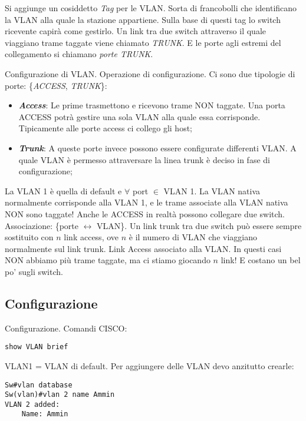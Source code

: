 Si aggiunge un cosiddetto \textit{Tag} per le VLAN. Sorta di francobolli che identificano la VLAN alla quale la stazione appartiene. Sulla base di questi tag lo switch ricevente capirà come gestirlo. Un link tra due switch attraverso il quale viaggiano trame taggate viene chiamato \textit{TRUNK}. E le porte agli estremi del collegamento si chiamano \textit{porte TRUNK}.

Configurazione di VLAN. Operazione di configurazione. Ci sono due tipologie di porte: \{\textit{ACCESS}, \textit{TRUNK}\}:

\begin{itemize}

\item{\textbf{\textit{Access}}}: Le prime trasmettono e ricevono trame NON taggate. Una porta ACCESS potrà gestire una sola VLAN alla quale essa corrisponde. Tipicamente alle porte access ci collego gli host;
\item{\textbf{\textit{Trunk}}}: A queste porte invece possono essere configurate differenti VLAN. A quale VLAN è permesso attraversare la linea trunk è deciso in fase di configurazione;
\end{itemize}

La VLAN 1 è quella di default e $\forall$ port $\in$ VLAN 1. La VLAN nativa normalmente corrisponde alla VLAN 1, e le trame associate alla VLAN nativa NON sono taggate! Anche le ACCESS in realtà possono collegare due switch. Associazione: \{porte $\leftrightarrow$ VLAN\}. Un link trunk tra due switch può essere sempre sostituito con $n$ link access, ove $n$ è il numero di VLAN che viaggiano normalmente sul link trunk. Link Access associato alla VLAN. In questi casi NON abbiamo più trame taggate, ma ci stiamo giocando $n$ link! E costano un bel po' sugli switch. 

\subsection{Configurazione}

Configurazione. Comandi CISCO:

\begin{lstlisting}[language=CISCO]
show VLAN brief
\end{lstlisting}

VLAN1 = VLAN di default. Per aggiungere delle VLAN devo anzitutto crearle:

\begin{lstlisting}[language=CISCO]
Sw#vlan database
Sw(vlan)#vlan 2 name Ammin
VLAN 2 added:
	Name: Ammin
\end{lstlisting}

